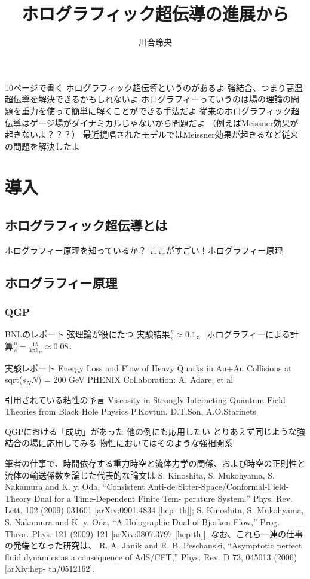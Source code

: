 \documentclass[b5paper,11pt,dvipdfmx]{jsarticle}
\numberwithin{equation}{section}
\theoremstyle{definition}
\begin{document}
\title{ホログラフィック超伝導の進展から}
\author{川合玲央}

\maketitle


10ページで書く
ホログラフィック超伝導というのがあるよ
強結合、つまり高温超伝導を解決できるかもしれないよ
ホログラフィーっていうのは場の理論の問題を重力を使って簡単に解くことができる手法だよ
従来のホログラフィック超伝導はゲージ場がダイナミカルじゃないから問題だよ
（例えばMeissner効果が起きないよ？？？）
最近提唱されたモデルではMeissner効果が起きるなど従来の問題を解決したよ

\section{導入}

\subsection{ホログラフィック超伝導とは}
ホログラフィー原理を知っているか？
ここがすごい！ホログラフィー原理

\subsection{ホログラフィー原理}

\subsubsection{QGP}
BNLのレポート
弦理論が役にたつ
実験結果$\frac{\eta}{s} \approx 0.1$，
ホログラフィーによる計算$\frac{\eta}{s} = \frac{1 \hbar}{4 \pi k_B} \approx 0.08$．

実験レポート
Energy Loss and Flow of Heavy Quarks in Au+Au Collisions at sqrt($s_NN$) = 200 GeV
PHENIX Collaboration: A. Adare, et al

引用されている粘性の予言
Viscosity in Strongly Interacting Quantum Field Theories from Black Hole Physics
P.Kovtun, D.T.Son, A.O.Starinets

QGPにおける「成功」があった
他の例にも応用したい
とりあえず同じような強結合の場に応用してみる
物性においてはそのような強相関系

筆者の仕事で、時間依存する重力時空と流体力学の関係、および時空の正則性と
流体の輸送係数を論じた代表的な論文は
S. Kinoshita, S. Mukohyama, S. Nakamura and K. y. Oda, “Consistent Anti-de
Sitter-Space/Conformal-Field-Theory Dual for a Time-Dependent Finite Tem-
perature System,” Phys. Rev. Lett. 102 (2009) 031601 [arXiv:0901.4834 [hep-
th]];
S. Kinoshita, S. Mukohyama, S. Nakamura and K. y. Oda, “A Holographic
Dual of Bjorken Flow,” Prog. Theor. Phys. 121 (2009) 121 [arXiv:0807.3797
[hep-th]].
なお、これら一連の仕事の発端となった研究は、
R. A. Janik and R. B. Peschanski, “Asymptotic perfect fluid dynamics as
a consequence of AdS/CFT,” Phys. Rev. D 73, 045013 (2006) [arXiv:hep-
th/0512162].
\end{document}
